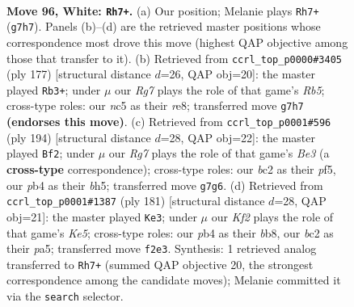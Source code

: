 \documentclass[11pt]{article}
\begin{document}
\clearpage

\begin{figure}[p]\centering
\begin{subfigure}{0.46\textwidth}\centering
\resizebox{\linewidth}{!}{%
\newchessgame
\chessboard[
  setfen={8/2N2PR1/8/2n5/1pB3Pk/8/2b2K2/8 w - - 1 96},
  showmover=false,
  pgfstyle=straightmove, color=movearrow, markmove={g7-h7}
]}
\caption{}
\end{subfigure}\hfill
\begin{subfigure}{0.46\textwidth}\centering
\resizebox{\linewidth}{!}{%
\newchessgame
\chessboard[
  setfen={4R3/6k1/B6p/8/1r5p/7K/8/8 b - - 1 89},
  showmover=false,
  pgfstyle=straightmove, color=movearrow, markmove={b4-b3}
]}
\caption{}
\end{subfigure}
\\[4pt]
\begin{subfigure}{0.46\textwidth}\centering
\resizebox{\linewidth}{!}{%
\newchessgame
\chessboard[
  setfen={k7/P7/8/K4p1b/5P2/4B3/8/8 w - - 0 98},
  showmover=false,
  pgfstyle=straightmove, color=movearrow, markmove={e3-f2}
]}
\caption{}
\end{subfigure}\hfill
\begin{subfigure}{0.46\textwidth}\centering
\resizebox{\linewidth}{!}{%
\newchessgame
\chessboard[
  setfen={1B6/8/p7/P5Kp/4k3/8/4b3/8 b - - 15 91},
  showmover=false,
  pgfstyle=straightmove, color=movearrow, markmove={e4-e3}
]}
\caption{}
\end{subfigure}
\caption{\textbf{Move 96, White: \texttt{Rh7+}.} (a) Our position; Melanie plays \texttt{Rh7+} (\texttt{g7h7}). Panels (b)--(d) are the retrieved master positions whose correspondence most drove this move (highest QAP objective among those that transfer to it). (b) Retrieved from \texttt{ccrl\_top\_p0000\#3405} (ply 177) [structural distance $d$=26, QAP obj=20]: the master played \texttt{Rb3+}; under $\mu$ our \emph{Rg7} plays the role of that game's \emph{Rb5}; cross-type roles: our \emph{n}c5 as their \emph{r}e8; transferred move \texttt{g7h7} \textbf{(endorses this move)}. (c) Retrieved from \texttt{ccrl\_top\_p0001\#596} (ply 194) [structural distance $d$=28, QAP obj=22]: the master played \texttt{Bf2}; under $\mu$ our \emph{Rg7} plays the role of that game's \emph{Be3} (a \textbf{cross-type} correspondence); cross-type roles: our \emph{b}c2 as their \emph{p}f5, our \emph{p}b4 as their \emph{b}h5; transferred move \texttt{g7g6}. (d) Retrieved from \texttt{ccrl\_top\_p0001\#1387} (ply 181) [structural distance $d$=28, QAP obj=21]: the master played \texttt{Ke3}; under $\mu$ our \emph{Kf2} plays the role of that game's \emph{Ke5}; cross-type roles: our \emph{p}b4 as their \emph{b}b8, our \emph{b}c2 as their \emph{p}a5; transferred move \texttt{f2e3}. Synthesis: 1 retrieved analog transferred to \texttt{Rh7+} (summed QAP objective 20, the strongest correspondence among the candidate moves); Melanie committed it via the \texttt{search} selector.}
\label{fig:thought-m190}
\end{figure}
\end{document}
